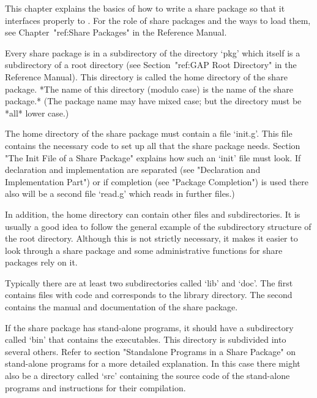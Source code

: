

This chapter explains the basics of how to write a share package so that it
interfaces properly to {\GAP}.
For the role of share packages and the ways to load them,
see Chapter~"ref:Share Packages" in the Reference Manual.


Every share package is in a subdirectory of the directory `pkg' which
itself is a subdirectory of a {\GAP} root directory
(see Section~"ref:GAP Root Directory" in the Reference Manual).
This directory is called the home directory of the share package.
*The name of this directory (modulo case) is the name of the share package.*
(The package name may have mixed case; but the directory must be *all* lower
case.)

The home directory of the share package must contain a file
`init.g'. This file contains the necessary {\GAP} code to set up all
that the share package needs. Section "The Init File of a Share
Package" explains how such an `init' file must look. If declaration
and implementation are separated (see "Declaration and Implementation
Part") or if completion (see "Package Completion") is used
there also will be a second file `read.g' which reads in
further files.)

In addition, the home directory can contain other files and
subdirectories. It is usually a good idea to follow the general
example of the subdirectory structure of the {\GAP} root directory.
Although this is not strictly necessary, it makes it easier to look
through a share package and some administrative functions for share
packages rely on it.

Typically there are at least two subdirectories called `lib' and
`doc'. The first contains files with {\GAP} code and corresponds to
the {\GAP} library directory. The second contains the manual and
documentation of the share package.

If the share package has stand-alone programs, it should have a
subdirectory called `bin' that contains the executables. This
directory is subdivided into several others. Refer to section
"Standalone Programs in a Share Package" on stand-alone programs for a
more detailed explanation. In this case there might also be a
directory called `src' containing the source code of the stand-alone
programs and instructions for their compilation.

